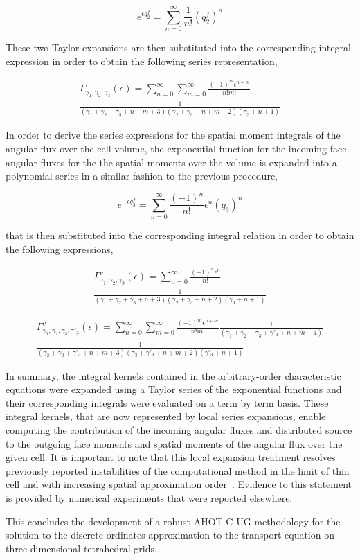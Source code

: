 \begin{equation}
    e^{\epsilon q_2^f} = \sum_{n=0}^{\infty} \frac{1}{n!} \left( q_2^f \right) ^n
\end{equation}

\noindent These two Taylor expansions are then substituted into the corresponding integral expression in order to obtain the following series representation,

\begin{multline}
    \Gamma_{\gamma_1 ,\gamma_2 ,\gamma_3} ( \epsilon ) = \sum_{n=0}^{\infty} \sum_{m=0}^{\infty} \frac{(-1)^m \epsilon^{n+m}}{n! m!} \\
    \frac{1}{( \gamma_1 + \gamma_2 + \gamma_3 +n+m+3) ( \gamma_2 + \gamma_3 +n+m+2) (\gamma_3 +n+1)}
\end{multline}

In order to derive the series expressions for the spatial moment integrals of the angular flux over the cell volume, the exponential function for the incoming face angular fluxes for the the spatial moments over the volume is expanded into a polynomial series in a similar fashion to the previous procedure,

\begin{equation}
    e^{- \epsilon q^f_3} = \sum_{n=0}^{\infty} \frac{(-1)^n}{n!} \epsilon^n \left( q_3 \right) ^n
\end{equation}

\noindent that is then substituted into the corresponding integral relation in order to obtain the following expressions,

\begin{multline}
    \Gamma^v_{\gamma_1 ,\gamma_2 ,\gamma_3} ( \epsilon ) = \sum_{n=0}^{\infty} \frac{(-1)^n \epsilon^{n}}{n!} \\
    \frac{1}{( \gamma_1 + \gamma_2 + \gamma_3 +n+3) ( \gamma_2 + \gamma_3 +n+2) (\gamma_3 +n+1)}
\end{multline}

\begin{multline}
    \Gamma^v_{\gamma_1 ,\gamma_2 ,\gamma_3 ,\gamma'_3} ( \epsilon ) = \sum_{n=0}^{\infty} \sum_{m=0}^{\infty} \frac{(-1)^m \epsilon^{n+m}}{n! m!} \frac{1}{( \gamma_1 + \gamma_2 + \gamma_3 + \gamma'_3 +n+m+4)}\\
    \frac{1}{( \gamma_2 + \gamma_3 + \gamma'_3 +n+m+3) ( \gamma_3 + \gamma'_3 +n+m+2) ( \gamma'_3 +n+1)}
\end{multline}

In summary, the integral kernels contained in the arbitrary-order characteristic equations were expanded using a Taylor series of the exponential functions and their corresponding integrals were evaluated on a term by term basis.
These integral kernels, that are now represented by local series expansions, enable computing the contribution of the incoming angular fluxes and distributed source to the outgoing face moments and spatial moments of the angular flux over the given cell.
It is important to note that this local expansion treatment resolves previously reported instabilities of the computational method in the limit of thin cell and with increasing spatial approximation order~\cite{Azmy2001}.
Evidence to this statement is provided by numerical experiments that were reported elsewhere.

This concludes the development of a robust \ac{AHOT-C-UG} methodology for the solution to the discrete-ordinates approximation to the transport equation
on three dimensional tetrahedral grids.